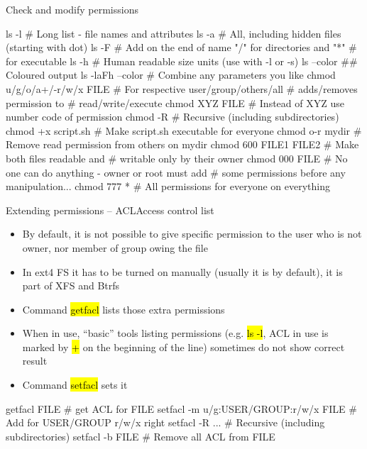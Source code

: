 \documentclass[compress, ucs, xelatex, 11pt, xcolor=svgnames,
  hyperref={
    bookmarks=true,
    unicode=true,
    colorlinks=true,
    pdftitle={Linux, command line and MetaCentrum},
    plainpages=false,
    pdfauthor={Vojtech Zeisek},
    pdfsubject={Course about use of Linux command line, writing shell scripts and using MetaCentrum of CESNET},
    pdfcreator={XeLaTeX},
    pdfkeywords={Linux, GNU, BASH, shell, command line, MetaCentrum},
    linkcolor=DarkRed,
    anchorcolor=DarkBlue,
    citecolor=Indigo,
    filecolor=NavyBlue,
    menucolor=DarkMagenta,
    urlcolor=DarkBlue,
    pdftex},
  url={hyphens, lowtilde} %
  ]{beamer}
\renewcommand{\texttt}[1]{\hl{\ttfamily #1}}
\begin{document}
\begin{frame}[fragile]{Check and modify permissions}
  \begin{bashcode}
    ls -l # Long list - file names and attributes
    ls -a # All, including hidden files (starting with dot)
    ls -F # Add on the end of name "/" for directories and "*"
          # for executable
    ls -h # Human readable size units (use with -l or -s)
    ls --color ## Coloured output
    ls -laFh --color # Combine any parameters you like
    chmod u/g/o/a+/-r/w/x FILE # For respective user/group/others/all
                               # adds/removes permission to
                               # read/write/execute
    chmod XYZ FILE # Instead of XYZ use number code of permission
    chmod -R # Recursive (including subdirectories)
    chmod +x script.sh # Make script.sh executable for everyone
    chmod o-r mydir # Remove read permission from others on mydir
    chmod 600 FILE1 FILE2 # Make both files readable and
                          # writable only by their owner
    chmod 000 FILE # No one can do anything - owner or root must add
                   # some permissions before any manipulation...
    chmod 777 * # All permissions for everyone on everything
  \end{bashcode}
\end{frame}

\begin{frame}[fragile, label=acl]{Extending permissions -- ACL}{Access control list}
\begin{itemize}
  \item By default, it is not possible to give specific permission to the user who is not owner, nor member of group owing the file
  \item In ext4 FS it has to be turned on manually (usually it is by default), it is part of XFS and Btrfs
  \item Command \texttt{getfacl} lists those extra permissions
  \item When in use, ``basic'' tools listing permissions (e.g. \texttt{ls -l}, ACL in use is marked by \texttt{+} on the beginning of the line) sometimes do not show correct result
  \item Command \texttt{setfacl} sets it
\end{itemize}
  \begin{bashcode}
    getfacl FILE # get ACL for FILE
    setfacl -m u/g:USER/GROUP:r/w/x FILE # Add for USER/GROUP r/w/x right
    setfacl -R ... # Recursive (including subdirectories)
    setfacl -b FILE # Remove all ACL from FILE
  \end{bashcode}
\end{frame}
\end{document}
